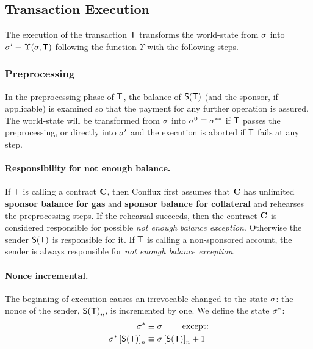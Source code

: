 
\subsection{Transaction Execution}

The execution of the transaction $\textsf{T}$ transforms the world-state from $\mathbf{\sigma}$ into $\mathbf{\sigma}'\equiv \Upsilon(\mathbf{\sigma},\textsf{T})$ following the function $\Upsilon$ with the following steps.

\subsubsection{Preprocessing}
\label{subsubsec:preprocessing}

In the preprocessing phase of $\textsf{T}$, the balance of $\mathsf{S}{\left({\textsf{T}} \right)}$ (and the sponsor, if applicable) is examined so that the payment for any further operation is assured.
The world-state will be transformed from $\mathbf{\sigma}$ into $\mathbf{\sigma}^0\equiv \mathbf{\sigma}^{**}$ if $\textsf{T}$ passes the preprocessing, or directly into $\mathbf{\sigma}'$ and the execution is aborted if $\textsf{T}$ fails at any step.

\paragraph{Responsibility for not enough balance.} 
If $\textsf{T}$ is calling a contract $\mathbf{C}$, then Conflux first assumes that $\mathbf{C}$ has unlimited
{\bf sponsor balance for gas} and {\bf sponsor balance for collateral} and rehearses the
preprocessing steps. If the rehearsal succeeds, then the contract $\mathbf{C}$ is considered responsible for 
possible \emph{not enough balance exception}. 
Otherwise the sender $\mathsf{S}{\left({\textsf{T}} \right)}$ is responsible for it.
If $\textsf{T}$ is calling a non-sponsored account, the sender is always responsible for \emph{not enough balance exception}.

\paragraph{Nonce incremental.}
The beginning of execution 
causes an irrevocable changed to the state $\mathbf{\sigma}$: 
the nonce of the sender, $\mathsf{S}{\left({\textsf{T}} \right)}_n$, is incremented by one. 
%
We define the state $\mathbf{\sigma}^*$:
\begin{align}
	\mathbf{\sigma}^*  &\equiv \mathbf{\sigma} \qquad \mbox{  except:}\\
	\mathbf{\sigma}^*\left[\mathsf{S}{\left({\textsf{T}} \right)} \right]_n &\equiv \mathbf{\sigma}\left[\mathsf{S}{\left({\textsf{T}} \right)} \right]_n+1 
\end{align}

